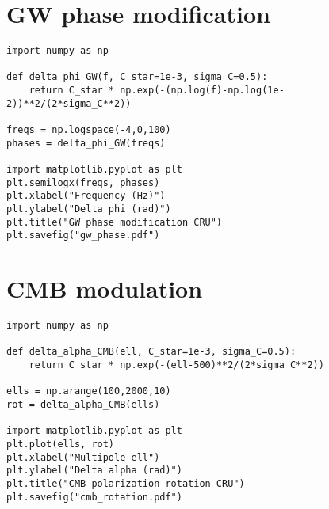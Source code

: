 \documentclass[%
 reprint,
 amsmath,amssymb,
 aps,
 pra,
 longbibliography,
 nofootinbib
]{revtex4-2}
\begin{document}
\section{GW phase modification}
\begin{verbatim}
import numpy as np

def delta_phi_GW(f, C_star=1e-3, sigma_C=0.5):
    return C_star * np.exp(-(np.log(f)-np.log(1e-2))**2/(2*sigma_C**2))

freqs = np.logspace(-4,0,100)
phases = delta_phi_GW(freqs)

import matplotlib.pyplot as plt
plt.semilogx(freqs, phases)
plt.xlabel("Frequency (Hz)")
plt.ylabel("Delta phi (rad)")
plt.title("GW phase modification CRU")
plt.savefig("gw_phase.pdf")
\end{verbatim}

\section{CMB modulation}
\begin{verbatim}
import numpy as np

def delta_alpha_CMB(ell, C_star=1e-3, sigma_C=0.5):
    return C_star * np.exp(-(ell-500)**2/(2*sigma_C**2))

ells = np.arange(100,2000,10)
rot = delta_alpha_CMB(ells)

import matplotlib.pyplot as plt
plt.plot(ells, rot)
plt.xlabel("Multipole ell")
plt.ylabel("Delta alpha (rad)")
plt.title("CMB polarization rotation CRU")
plt.savefig("cmb_rotation.pdf")
\end{verbatim}
\end{document}
